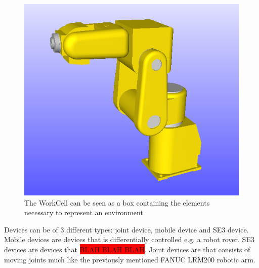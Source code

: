 \begin{figure}[h]
	\centering
	\includegraphics[scale=0.55]{Figures/FANUCLRM200.png}
	\caption{The WorkCell can be seen as a box containing the elements necessary to represent an environment}
	\label{fig:FANUCLRM200}
\end{figure}

Devices can be of 3 different types: joint device, mobile device and SE3 device. Mobile devices are devices that  is differentially controlled e.g. a robot rover. SE3 devices are devices that \colorbox{red}{BLAH BLAH BLAH}. Joint devices are that consists of moving joints much like the previously mentioned FANUC LRM200 robotic arm.\\

